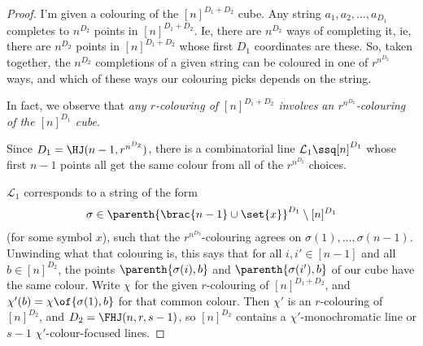 \begin{proof}
I'm given a colouring of the $[n]^{D_1 + D_2}$ cube. Any string $a_1, a_2, \ldots, a_{D_1}$ completes to $n^{D_2}$ points in $[n]^{D_1 + D_2}$. Ie, there are $n^{D_2}$ ways of completing it, ie, there are $n^{D_2}$ points in $[n]^{D_1 + D_2}$ whose first $D_1$ coordinates are these. So, taken together, the $n^{D_2}$ completions of a given string can be coloured in one of $r^{n^{D_2}}$ ways, and which of these ways our colouring picks depends on the string.

In fact, we observe that \textit{any $r$-colouring of $[n]^{D_1 + D_2}$ involves an $r^{n^{D_2}}$-colouring of the $[n]^{D_1}$ cube.}

Since $D_1 = \HJ(n - 1, r^{n^{D_2}})$, there is a combinatorial line $\mathcal{L}_1 \ssq [n]^{D_1}$ whose first $n - 1$ points all get the same colour from all of the $r^{n^{D_2}}$ choices.

$\mathcal{L}_1$ corresponds to a string of the form
\begin{align*}
    \sigma \in \parenth{\brac{n - 1} \cup \set{x}}^{D_1} \setminus [n]^{D_1}
\end{align*}
(for some symbol $x$), such that the $r^{n^{D_2}}$-colouring agrees on $\sigma(1), \ldots, \sigma(n - 1)$.
Unwinding what that colouring is, this says that for all $i, i' \in [n - 1]$ and all $b \in [n]^{D_2}$, the points $\parenth{\sigma(i), b}$ and $\parenth{\sigma(i'), b}$ of our cube have the same colour. Write $\chi$ for the given $r$-colouring of $[n]^{D_1 + D_2}$, and $\chi'(b) = \chi\of{\sigma(1), b}$ for that common colour. Then $\chi'$ is an $r$-colouring of $[n]^{D_2}$, and $D_2 = \FHJ(n, r, s - 1)$, so $[n]^{D_2}$ contains a $\chi'$-monochromatic line or $s - 1$ $\chi'$-colour-focused lines.


\end{proof}

